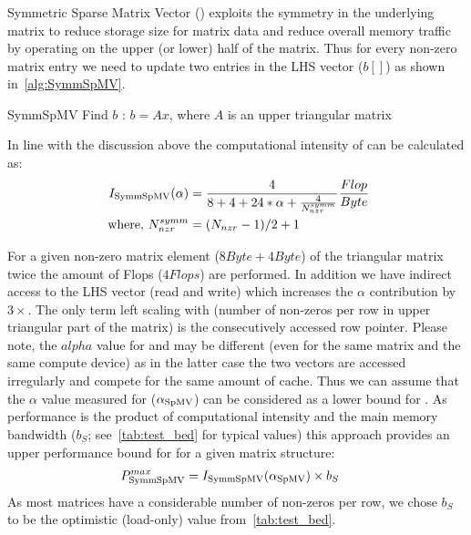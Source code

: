 \subsubsection{\SymmSpmv}
\label{sect:SymmSpmv}
Symmetric Sparse Matrix Vector (\SymmSpmv) exploits the symmetry in the underlying matrix to reduce storage size for matrix data and reduce overall memory traffic by  operating on the upper (or lower) half of the matrix. Thus for every non-zero matrix entry we need to update two entries in the LHS vector ($b[]$) as shown in~\cref{alg:SymmSpMV}.
\begin{algorithm}[H]
	\caption{SymmSpMV Find $b$ : $b=Ax$, where $A$ is an upper triangular matrix} 
	\label{alg:SymmSpMV}
	\begin{algorithmic}[1]
		\ENDFOR
		\ENDFOR
	\end{algorithmic}
\end{algorithm}
In line with the discussion above the computational intensity of \SymmSpmv can be calculated as:
\begin{align}
\label{eq:SymmSpMV_intensity}
I_\mathrm{\SymmSpmv} (\alpha) &= \frac{4}{8+4+24*\alpha+\frac{4}{\NNZRmathSYMM}} \frac{Flop}{Byte}\\
\label{eq:NNZR_symm}
\text{ where,  } \NNZRmathSYMM &= (\NNZRmath-1)/2 + 1
\end{align}

For a given non-zero matrix element ($8 Byte + 4 Byte$) of the triangular matrix twice the amount of Flops ($4 Flops$)  are performed. In addition we have indirect access to the LHS vector (read and write) which increases the $\alpha$ contribution by $3\times$. The only term left scaling with \NNZRSYMM (number of non-zeros per row in upper triangular part of the matrix) is the consecutively accessed row pointer. Please note, the $alpha$ value for \SpMV and \SymmSpmv may be different (even for the same matrix and the same compute device) as in the latter case the two vectors are accessed irregularly and compete for the same amount of cache. Thus we can assume that the $\alpha$ value measured for \SpMV ($\alpha_\mathrm{SpMV}$) can be considered as a lower bound for \SymmSpmv. As performance is the product of computational intensity and the main memory bandwidth ($b_S$; see~\cref{tab:test_bed} for typical values) this approach provides an upper performance bound for \SymmSpmv for a given matrix structure:
 \begin{align}
\label{eq:SymmSpMV_performance}
P^{max}_\mathrm{\SymmSpmv}  &= I_\mathrm{\SymmSpmv} (\alpha_\mathrm{\SpMV})  \times b_S
\end{align}
As most matrices have a considerable number of non-zeros per row, we chose $b_S$ to be the optimistic (load-only) value  from~\cref{tab:test_bed}.


